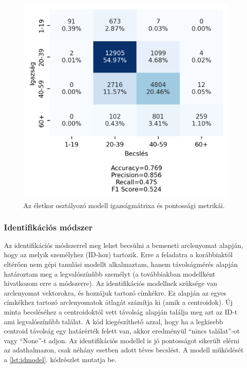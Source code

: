 \begin{figure}[ht]
	\centering
	\includegraphics[width=0.7\columnwidth]{figures/conf_age.png}
	\caption{Az életkor osztályozó modell igazságmátrixa és pontossági metrikái.}
	\label{fig:conf_age}
\end{figure}

\subsubsection*{Identifikációs módszer}

Az identifikációs módszerrel meg lehet becsülni a bemeneti arclenyomat alapján, hogy az melyik személyhez (ID-hoz) tartozik. Erre a feladatra a korábbiaktól eltérően nem gépi tanulási modellt alkalmaztam, hanem távolságmérés alapján határoztam meg a legvalószínűbb személyt (a továbbiakban modellként hivatkozom erre a módszerre). Az identifikációs modellnek szüksége van arclenyomat vektorokra, és hozzájuk tartozó címkékre. Ez alapján az egyes címkékhez tartozó arclenyomatok átlagát számítja ki (amik a centroidok). Új minta becsléséhez a centroidoktól vett távolság alapján találja meg azt az ID-t ami legvalószínűbb találat. A kód kiegészíthető azzal, hogy ha a legkisebb centroid távolság egy határérték felett van, akkor eredményül ``nincs találat''-ot vagy ``None''-t adjon. Az identifikációs modellel is jó pontosságot sikerült elérni az adathalmazon, csak néhány esetben adott téves becslést. A modell működését a \ref{lst:idmodel}. kódrészlet mutatja be.

